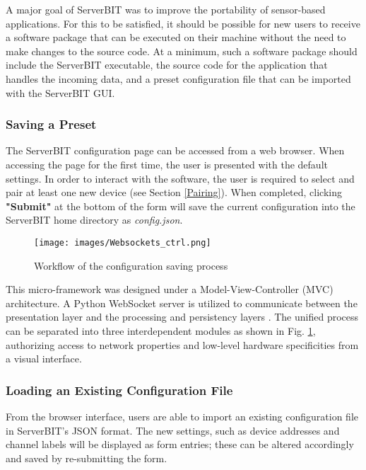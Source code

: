A major goal of ServerBIT was to improve the portability of sensor-based applications. For this to be satisfied, it should be possible for new users to receive a software package that can be executed on their machine without the need to make changes to the source code. At a minimum, such a software package should include the ServerBIT executable, the source code for the application that handles the incoming data, and a preset configuration file that can be imported with the ServerBIT GUI.

\subsubsection{Saving a Preset}

The ServerBIT configuration page can be accessed from a web browser. When accessing the page for the first time, the user is presented with the default settings. In order to interact with the software, the user is required to select and pair at least one new device (see Section \ref{Pairing}). When completed, clicking \textbf{"Submit"} at the bottom of the form will save the current configuration into the ServerBIT home directory as \textit{config.json}.

\begin{figure}[htb!]
    \centering
    \texttt{[image: images/Websockets\_ctrl.png]}
    \caption{Workflow of the configuration saving process}
    \label{fig:MVC Diagram}
\end{figure}

This micro-framework was designed under a Model-View-Controller (MVC) architecture. A Python WebSocket server is utilized to communicate between the presentation layer and the processing and persistency layers \cite{da_silva_web-based_2012}. The unified process can be separated into three interdependent modules as shown in Fig. \ref{fig:MVC Diagram}, authorizing access to network properties and low-level hardware specificities from a visual interface.

\subsubsection{Loading an Existing Configuration File}

From the browser interface, users are able to import an existing configuration file in ServerBIT's JSON format. The new settings, such as device addresses and channel labels will be displayed as form entries; these can be altered accordingly and saved by re-submitting the form.

